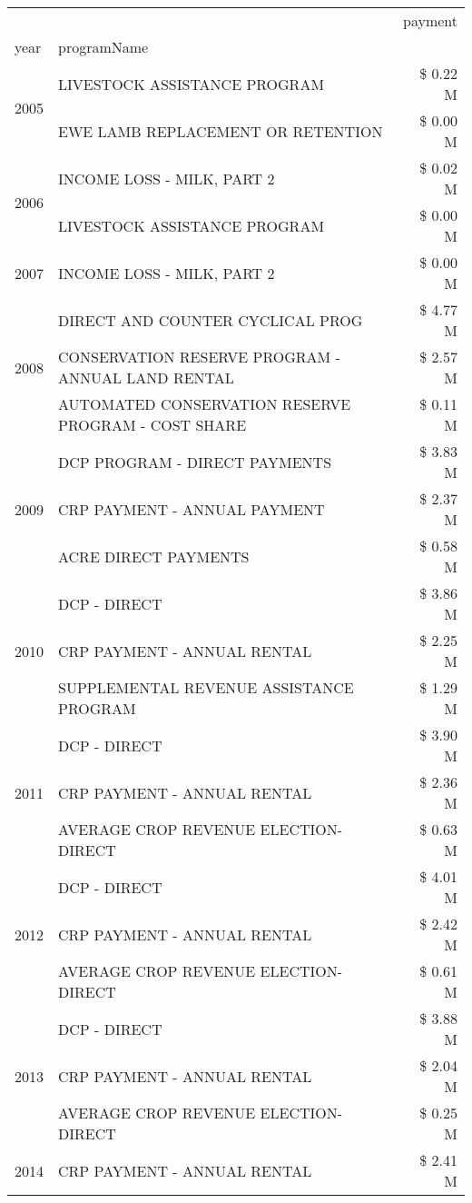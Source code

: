 \begin{tabular}{llr}
\toprule
 &  & payment \\
year & programName &  \\
\midrule
\multirow[t]{2}{*}{2005} & LIVESTOCK ASSISTANCE PROGRAM & \$ 0.22 M \\
 & EWE LAMB REPLACEMENT OR RETENTION & \$ 0.00 M \\
\cline{1-3}
\multirow[t]{2}{*}{2006} & INCOME LOSS - MILK, PART 2 & \$ 0.02 M \\
 & LIVESTOCK ASSISTANCE PROGRAM & \$ 0.00 M \\
\cline{1-3}
2007 & INCOME LOSS - MILK, PART 2 & \$ 0.00 M \\
\cline{1-3}
\multirow[t]{3}{*}{2008} & DIRECT AND COUNTER CYCLICAL PROG & \$ 4.77 M \\
 & CONSERVATION RESERVE PROGRAM - ANNUAL LAND RENTAL & \$ 2.57 M \\
 & AUTOMATED CONSERVATION RESERVE PROGRAM - COST SHARE & \$ 0.11 M \\
\cline{1-3}
\multirow[t]{3}{*}{2009} & DCP PROGRAM - DIRECT PAYMENTS & \$ 3.83 M \\
 & CRP PAYMENT - ANNUAL PAYMENT & \$ 2.37 M \\
 & ACRE DIRECT PAYMENTS & \$ 0.58 M \\
\cline{1-3}
\multirow[t]{3}{*}{2010} & DCP - DIRECT & \$ 3.86 M \\
 & CRP PAYMENT - ANNUAL RENTAL & \$ 2.25 M \\
 & SUPPLEMENTAL REVENUE ASSISTANCE PROGRAM & \$ 1.29 M \\
\cline{1-3}
\multirow[t]{3}{*}{2011} & DCP - DIRECT & \$ 3.90 M \\
 & CRP PAYMENT - ANNUAL RENTAL & \$ 2.36 M \\
 & AVERAGE CROP REVENUE ELECTION-DIRECT & \$ 0.63 M \\
\cline{1-3}
\multirow[t]{3}{*}{2012} & DCP - DIRECT & \$ 4.01 M \\
 & CRP PAYMENT - ANNUAL RENTAL & \$ 2.42 M \\
 & AVERAGE CROP REVENUE ELECTION-DIRECT & \$ 0.61 M \\
\cline{1-3}
\multirow[t]{3}{*}{2013} & DCP - DIRECT & \$ 3.88 M \\
 & CRP PAYMENT - ANNUAL RENTAL & \$ 2.04 M \\
 & AVERAGE CROP REVENUE ELECTION-DIRECT & \$ 0.25 M \\
\cline{1-3}
\multirow[t]{3}{*}{2014} & CRP PAYMENT - ANNUAL RENTAL & \$ 2.41 M \\

\end{tabular}
